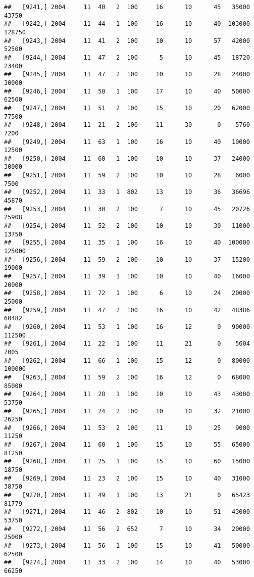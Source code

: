 \documentclass{article}\usepackage[]{graphicx}\usepackage[]{color}
\makeatletter
\newenvironment{kframe}{%
 \def\at@end@of@kframe{}%
 \ifinner\ifhmode%
  \def\at@end@of@kframe{\end{minipage}}%
  \begin{minipage}{\columnwidth}%
 \fi\fi%
 \def\FrameCommand##1{\hskip\@totalleftmargin \hskip-\fboxsep
 \colorbox{shadecolor}{##1}\hskip-\fboxsep
     \hskip-\linewidth \hskip-\@totalleftmargin \hskip\columnwidth}%
 \MakeFramed {\advance\hsize-\width
   \@totalleftmargin\z@ \linewidth\hsize
   \@setminipage}}%
 {\par\unskip\endMakeFramed%
 \at@end@of@kframe}
\newenvironment{knitrout}{}{} %
\makeatother
\begin{document}
\begin{knitrout}
\begin{kframe}
\begin{verbatim}
##   [9241,] 2004     11  40   2  100     16      10      45   35000   43750
##   [9242,] 2004     11  44   1  100     16      10      40  103000  128750
##   [9243,] 2004     11  41   2  100     10      10      57   42000   52500
##   [9244,] 2004     11  47   2  100      5      10      45   18720   23400
##   [9245,] 2004     11  47   2  100     10      10      28   24000   30000
##   [9246,] 2004     11  50   1  100     17      10      40   50000   62500
##   [9247,] 2004     11  51   2  100     15      10      20   62000   77500
##   [9248,] 2004     11  21   2  100     11      30       0    5760    7200
##   [9249,] 2004     11  63   1  100     16      10      40   10000   12500
##   [9250,] 2004     11  60   1  100     10      10      37   24000   30000
##   [9251,] 2004     11  59   2  100     10      10      28    6000    7500
##   [9252,] 2004     11  33   1  802     13      10      36   36696   45870
##   [9253,] 2004     11  30   2  100      7      10      45   20726   25908
##   [9254,] 2004     11  52   2  100     10      10      30   11000   13750
##   [9255,] 2004     11  35   1  100     16      10      40  100000  125000
##   [9256,] 2004     11  59   2  100     10      10      37   15200   19000
##   [9257,] 2004     11  39   1  100     10      10      40   16000   20000
##   [9258,] 2004     11  72   1  100      6      10      24   20000   25000
##   [9259,] 2004     11  47   2  100     16      10      42   48386   60482
##   [9260,] 2004     11  53   1  100     16      12       0   90000  112500
##   [9261,] 2004     11  22   1  100     11      21       0    5604    7005
##   [9262,] 2004     11  66   1  100     15      12       0   80000  100000
##   [9263,] 2004     11  59   2  100     16      12       0   68000   85000
##   [9264,] 2004     11  28   1  100     10      10      43   43000   53750
##   [9265,] 2004     11  24   2  100     10      10      32   21000   26250
##   [9266,] 2004     11  53   2  100     11      10      25    9000   11250
##   [9267,] 2004     11  60   1  100     15      10      55   65000   81250
##   [9268,] 2004     11  25   1  100     15      10      60   15000   18750
##   [9269,] 2004     11  23   2  100     15      10      40   31000   38750
##   [9270,] 2004     11  49   1  100     13      21       0   65423   81779
##   [9271,] 2004     11  46   2  802     10      10      51   43000   53750
##   [9272,] 2004     11  56   2  652      7      10      34   20000   25000
##   [9273,] 2004     11  56   1  100     15      10      41   50000   62500
##   [9274,] 2004     11  33   2  100     14      10      40   53000   66250

\end{verbatim}
\end{kframe}
\end{knitrout}
\end{document}
